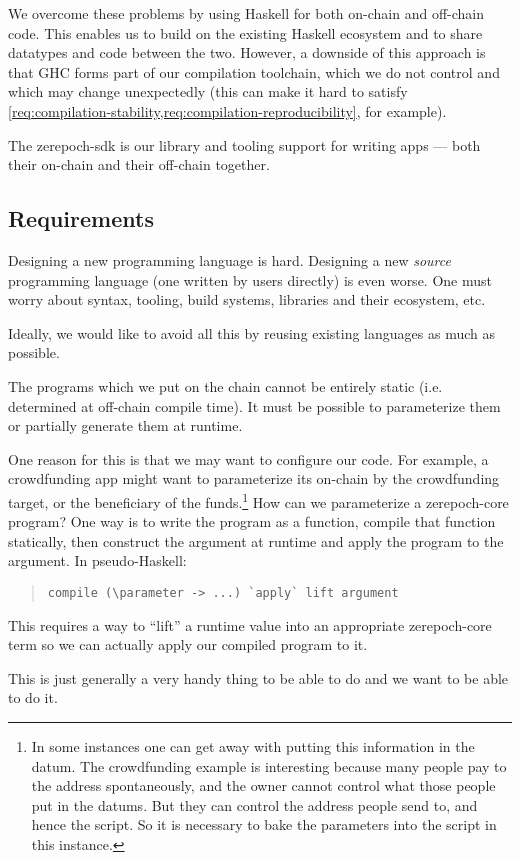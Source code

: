 We overcome these problems by using Haskell for both \gls{on-chain} and \gls{off-chain} code.
This enables us to build on the existing Haskell ecosystem and to share datatypes and code between the two.
However, a downside of this approach is that GHC forms part of our compilation toolchain, which we do not control and which may change unexpectedly (this can make it hard to satisfy \cref{req:compilation-stability,req:compilation-reproducibility}, for example).

The \gls{zerepoch-sdk} is our library and tooling support for writing \glspl{app} --- both their \gls{on-chain} and their \gls{off-chain} together.

\subsection{Requirements}
\begin{requirement}[Conservatism]
\label{req:source-lang-conservatism}
Designing a new programming language is hard.
Designing a new \emph{source} programming language (one written by users directly) is even worse.
One must worry about syntax, tooling, build systems, libraries and their ecosystem, etc.

Ideally, we would like to avoid all this by reusing existing languages as much as possible.
\end{requirement}

\begin{requirement}
\label{req:runtime-args}
The programs which we put on the chain cannot be entirely static (i.e. determined at \gls{off-chain} compile time).
It must be possible to parameterize them or partially generate them at runtime.

One reason for this is that we may want to configure our code.
For example, a crowdfunding \gls{app} might want to parameterize its \gls{on-chain} by the crowdfunding target, or the beneficiary of the funds.\footnote{
In some instances one can get away with putting this information in the \gls{datum}.
The crowdfunding example is interesting because many people pay to the \gls{address} spontaneously, and the owner cannot control what those people put in the \glspl{datum}.
But they can control the \gls{address} people send to, and hence the \gls{script}.
So it is necessary to bake the parameters into the \gls{script} in this instance.
}
How can we parameterize a \gls{zerepoch-core} program?
One way is to write the program as a function, compile that function statically, then construct the argument at runtime and apply the program to the argument.
In pseudo-Haskell:
\begin{quote}
\begin{verbatim}
compile (\parameter -> ...) `apply` lift argument
\end{verbatim}
\end{quote}
\noindent This requires a way to ``lift'' a runtime value into an appropriate \gls{zerepoch-core} term so we can actually apply our compiled program to it.

This is just generally a very handy thing to be able to do and we want to be able to do it.
\end{requirement}

